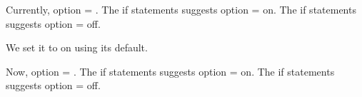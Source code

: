\documentclass{article}
\begin{document}
    \maketitle
    \makeatletter
        Currently, option = \test@option.
        \iftest@option@on 
            The if statements suggests option = on.
        \else 
            The if statements suggests option = off.
        \fi
        \par 
        We set it to on using its default. 
        \par
        Now, option = \test@option.
        \iftest@option@on 
            The if statements suggests option = on.
        \else 
            The if statements suggests option = off.
        \fi
    \makeatother
\end{document}
